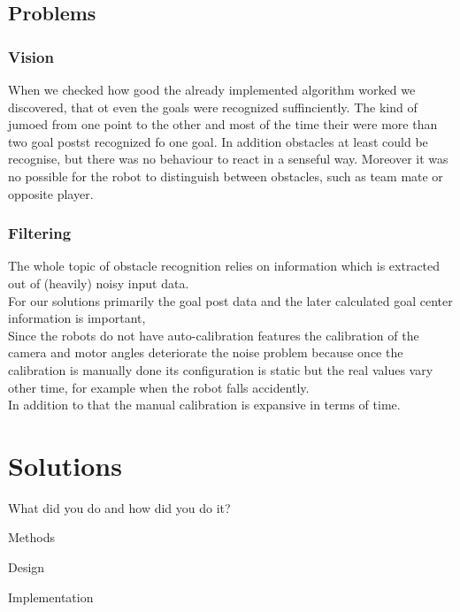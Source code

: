 \documentclass[lnicst,a4paper]{svmultln}
\begin{document}

\subsection{Problems}

\subsubsection{Vision}
When we checked how good the already implemented algorithm worked we discovered, that ot even the goals were recognized suffinciently. The kind of jumoed from one point to the other and most of the time their were more than two goal postst recognized fo one goal. In addition obstacles at least could be recognise, but there was no behaviour to react in a senseful way. Moreover it was no possible for the robot to distinguish between obstacles, such as team mate or opposite player.

\subsubsection{Filtering}
The whole topic of obstacle recognition relies on information which is extracted out of (heavily) noisy input data.
\\
For our solutions primarily the goal post data and the later calculated goal center information is important, 
\\
Since the robots do not have auto-calibration features the calibration of the camera and motor angles deteriorate the noise problem because once the calibration is manually done its configuration is static but the real values vary other time, for example when the robot falls accidently.
\\
In addition to that the manual calibration is expansive in terms of time.







\section{Solutions}
What did you do and how did you do it?

Methods

Design

Implementation
\end{document}
